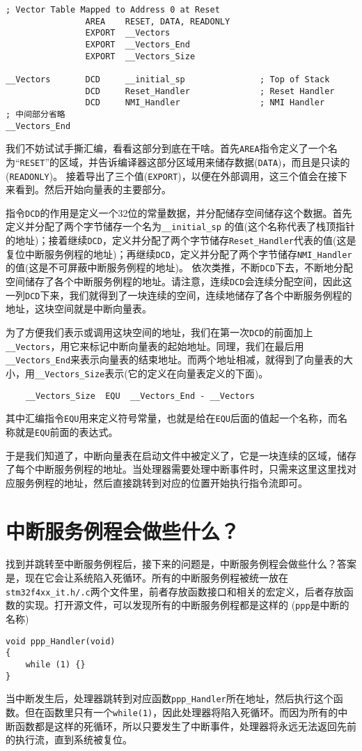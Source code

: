 \begin{lstlisting}
; Vector Table Mapped to Address 0 at Reset
                AREA    RESET, DATA, READONLY
                EXPORT  __Vectors
                EXPORT  __Vectors_End
                EXPORT  __Vectors_Size

__Vectors       DCD     __initial_sp               ; Top of Stack
                DCD     Reset_Handler              ; Reset Handler
                DCD     NMI_Handler                ; NMI Handler
; 中间部分省略
__Vectors_End
\end{lstlisting}

我们不妨试试手撕汇编，看看这部分到底在干啥。首先\verb|AREA|指令定义了一个名为“\verb|RESET|”的区域，并告诉编译器这部分区域用来储存数据(\verb|DATA|)，而且是只读的(\verb|READONLY|)。
接着导出了三个值(\verb|EXPORT|)，以便在外部调用，这三个值会在接下来看到。然后开始向量表的主要部分。

指令\verb|DCD|的作用是定义一个32位的常量数据，并分配储存空间储存这个数据。首先定义并分配了两个字节储存一个名为\verb|__initial_sp|
的值(这个名称代表了栈顶指针的地址)；接着继续\verb|DCD|，定义并分配了两个字节储存\verb|Reset_Handler|代表的值(这是复位中断服务例程的地址)；再继续\verb|DCD|，定义并分配了两个字节储存\verb|NMI_Handler|的值(这是不可屏蔽中断服务例程的地址)。
依次类推，不断\verb|DCD|下去，不断地分配空间储存了各个中断服务例程的地址。请注意，连续\verb|DCD|会连续分配空间，因此这一列\verb|DCD|下来，我们就得到了一块连续的空间，连续地储存了各个中断服务例程的地址，这块空间就是中断向量表。

为了方便我们表示或调用这块空间的地址，我们在第一次\verb|DCD|的前面加上\verb|__Vectors|，用它来标记中断向量表的起始地址。同理，我们在最后用\verb|__Vectors_End|来表示向量表的结束地址。而两个地址相减，就得到了向量表的大小，用\verb|__Vectors_Size|表示(它的定义在向量表定义的下面)。
\begin{lstlisting}
    __Vectors_Size  EQU  __Vectors_End - __Vectors
\end{lstlisting}
其中汇编指令\verb|EQU|用来定义符号常量，也就是给在\verb|EQU|后面的值起一个名称，而名称就是\verb|EQU|前面的表达式。

于是我们知道了，中断向量表在启动文件中被定义了，它是一块连续的区域，储存了每个中断服务例程的地址。当处理器需要处理中断事件时，只需来这里这里找对应服务例程的地址，然后直接跳转到对应的位置开始执行指令流即可。
\section{中断服务例程会做些什么？}
找到并跳转至中断服务例程后，接下来的问题是，中断服务例程会做些什么？答案是，现在它会让系统陷入死循环。所有的中断服务例程被统一放在\verb|stm32f4xx_it.h/.c|两个文件里，前者存放函数接口和相关的宏定义，后者存放函数的实现。打开源文件，可以发现所有的中断服务例程都是这样的
(\verb|ppp|是中断的名称)
\begin{lstlisting}
void ppp_Handler(void)
{
    while (1) {}
}
\end{lstlisting}
当中断发生后，处理器跳转到对应函数\verb|ppp_Handler|所在地址，然后执行这个函数。但在函数里只有一个\verb|while(1)|，因此处理器将陷入死循环。而因为所有的中断函数都是这样的死循环，所以只要发生了中断事件，处理器将永远无法返回先前的执行流，直到系统被复位。

